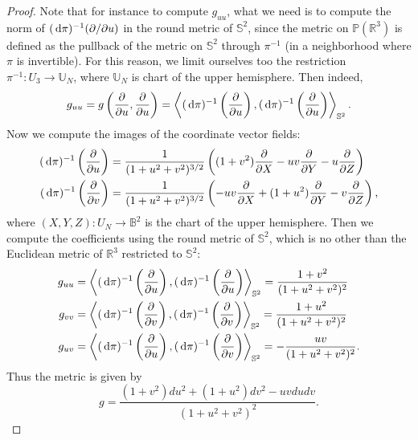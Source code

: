 \documentclass{report}
\begin{document}
    \begin{proof}
        Note that for instance to compute $g_{uu}$, what we need is to compute the norm of $(\,\mathrm{d} \pi)^{-1}(\partial/\partial u)$ in the round metric of $\mathbb S^2$, since the metric on $\mathbb P(\mathbb R^3)$ is defined as the pullback of the metric on $\mathbb S^2$ through $\pi^{-1}$ (in a neighborhood where $\pi$ is invertible).
        For this reason, we limit ourselves too the restriction $\pi^{-1}: U_3 \to \mathbb U_N$, where $\mathbb U_N$ is chart of the upper hemisphere.
        Then indeed,
        \[
        g_{uu} = g\left(\frac{\partial}{\partial u}, \frac{\partial}{\partial u}\right) = 
        \left\langle (\,\mathrm{d} \pi)^{-1}\left(\frac{\partial}{\partial u}\right), (\,\mathrm{d} \pi)^{-1}\left(\frac{\partial}{\partial u}\right) \right\rangle_{\mathbb S^2}.
        \]
        Now we compute the images of the coordinate vector fields:
        \begin{align*}
            (\,\mathrm{d} \pi)^{-1}\left(\frac{\partial}{\partial u}\right) &= \frac{1}{(1+ u^2 + v^2)^{3/2}} \left((1 + v^2) \frac{\partial}{\partial X} - uv \frac{\partial}{\partial Y} - u \frac{\partial}{\partial Z}\right)\\
            (\,\mathrm{d} \pi)^{-1}\left(\frac{\partial}{\partial v}\right) &= \frac{1}{(1+ u^2 + v^2)^{3/2}} \left(-uv \frac{\partial}{\partial X} + (1 + u^2) \frac{\partial}{\partial Y} - v \frac{\partial}{\partial Z}\right),
        \end{align*}
        where $(X,Y,Z): U_N \to \mathbb B^2$ is the chart of the upper hemisphere.
        Then we compute the coefficients using the round metric of $\mathbb S^2$, which is no other than the Euclidean metric of $\mathbb R^3$ restricted to $\mathbb S^2$:
    \begin{align*}
        g_{uu} &= \left\langle (\,\mathrm{d} \pi)^{-1}\left(\frac{\partial}{\partial u}\right), (\,\mathrm{d} \pi)^{-1}\left(\frac{\partial}{\partial u}\right) \right\rangle_{\mathbb S^2} = \frac{1 + v^2}{(1 + u^2 + v^2)^2}\\
        g_{vv} &= \left\langle (\,\mathrm{d} \pi)^{-1}\left(\frac{\partial}{\partial v}\right), (\,\mathrm{d} \pi)^{-1}\left(\frac{\partial}{\partial v}\right) \right\rangle_{\mathbb S^2} = \frac{1 + u^2}{(1 + u^2 + v^2)^2}\\
        g_{uv} &= \left\langle (\,\mathrm{d} \pi)^{-1}\left(\frac{\partial}{\partial u}\right), (\,\mathrm{d} \pi)^{-1}\left(\frac{\partial}{\partial v}\right) \right\rangle_{\mathbb S^2} = - \frac{uv}{(1 + u^2 + v^2)^2}.
    \end{align*}
    Thus the metric is given by
    \[
    g = \frac{(1 + v^2) du^2 + (1 + u^2) dv^2 - uv du dv}{(1 + u^2 + v^2)^2}.
    \]
    \end{proof}
\end{document}
